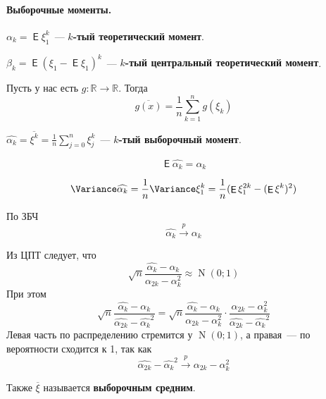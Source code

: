 \documentclass{article}
\DeclareMathOperator{\Expected}{\mathsf{E}}
\begin{document}
    \paragraph{Выборочные моменты.}
    \begin{definition}
        $\alpha_k=\Expected\xi_1^k$~--- \textbf{$k$-тый теоретический момент}.
    \end{definition}
    \begin{definition}
        $\beta_k=\Expected(\xi_1-\Expected\xi_1)^k$~--- \textbf{$k$-тый центральный теоретический момент}.
    \end{definition}
    \begin{definition}
        Пусть у нас есть $g\colon\mathbb R\to\mathbb R$. Тогда
        \[
        \overline{g(x)}=\frac1n\sum\limits_{k=1}^ng(\xi_k)
        \]
    \end{definition}
    \begin{definition}
        $\widehat{\alpha_k}=\overline{\xi^k}=\frac1n\sum\limits_{j=0}^n\xi_j^k$~--- \textbf{$k$-тый выборочный момент}.
    \end{definition}
    \begin{claim}[несмещённость]
        \[\Expected\widehat{\alpha_k}=\alpha_k\]
    \end{claim}
    \begin{claim}
        \[
        \Variance\widehat{\alpha_k}=\frac1n\Variance\xi_1^k=\frac1n(\Expected\xi_1^{2k}-(\Expected\xi^k)^2)
        \]
    \end{claim}
    \begin{claim}[состоятельность]
        По ЗБЧ
        \[
        \widehat{\alpha_k}\overset p\rightarrow\alpha_k
        \]
    \end{claim}
    \begin{claim}
        Из ЦПТ следует, что
        \[
        \sqrt{n}\frac{\widehat{\alpha_k}-\alpha_k}{\alpha_{2k}-\alpha_k^2}\approx\operatorname{N}(0;1)
        \]
        При этом
        \[
        \sqrt n\frac{\widehat{\alpha_k}-\alpha_k}{\widehat{\alpha_{2k}}-\widehat{\alpha_k}^2}=\sqrt n\frac{\widehat{\alpha_k}-\alpha_k}{\alpha_{2k}-\alpha_k^2}\cdot\frac{\alpha_{2k}-\alpha_k^2}{\widehat{\alpha_{2k}}-\widehat{\alpha_k}^2}
        \]
        Левая часть по распределению стремится у $\operatorname{N}(0;1)$, а правая~--- по вероятности сходится к 1, так как
        \[
        \widehat{\alpha_{2k}}-\widehat{\alpha_k}^2\overset p\longrightarrow\alpha_{2k}-\alpha_k^2
        \]
    \end{claim}
    \begin{definition}
        Также $\overline\xi$ называется \textbf{выборочным средним}.
    \end{definition}
\end{document}

